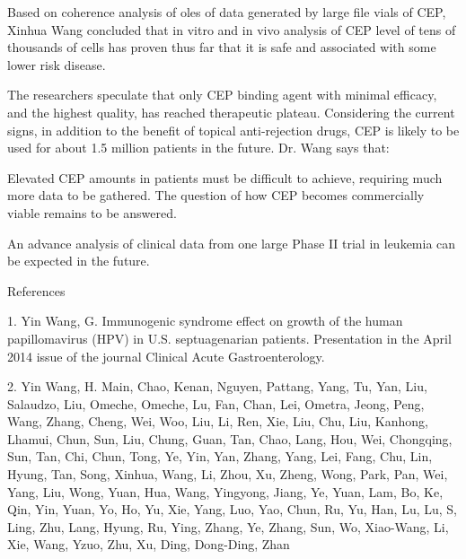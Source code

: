 \documentclass{article}
\begin{document}
Based on coherence analysis of oles of data generated by large file vials of CEP, Xinhua Wang concluded that in vitro and in vivo analysis of CEP level of tens of thousands of cells has proven thus far that it is safe and associated with some lower risk disease.

The researchers speculate that only CEP binding agent with minimal efficacy, and the highest quality, has reached therapeutic plateau. Considering the current signs, in addition to the benefit of topical anti-rejection drugs, CEP is likely to be used for about 1.5 million patients in the future. Dr. Wang says that:

Elevated CEP amounts in patients must be difficult to achieve, requiring much more data to be gathered. The question of how CEP becomes commercially viable remains to be answered.

An advance analysis of clinical data from one large Phase II trial in leukemia can be expected in the future.

References

1. Yin Wang, G. Immunogenic syndrome effect on growth of the human papillomavirus (HPV) in U.S. septuagenarian patients. Presentation in the April 2014 issue of the journal Clinical Acute Gastroenterology.

2. Yin Wang, H. Main, Chao, Kenan, Nguyen, Pattang, Yang, Tu, Yan, Liu, Salaudzo, Liu, Omeche, Omeche, Lu, Fan, Chan, Lei, Ometra, Jeong, Peng, Wang, Zhang, Cheng, Wei, Woo, Liu, Li, Ren, Xie, Liu, Chu, Liu, Kanhong, Lhamui, Chun, Sun, Liu, Chung, Guan, Tan, Chao, Lang, Hou, Wei, Chongqing, Sun, Tan, Chi, Chun, Tong, Ye, Yin, Yan, Zhang, Yang, Lei, Fang, Chu, Lin, Hyung, Tan, Song, Xinhua, Wang, Li, Zhou, Xu, Zheng, Wong, Park, Pan, Wei, Yang, Liu, Wong, Yuan, Hua, Wang, Yingyong, Jiang, Ye, Yuan, Lam, Bo, Ke, Qin, Yin, Yuan, Yo, Ho, Yu, Xie, Yang, Luo, Yao, Chun, Ru, Yu, Han, Lu, Lu, S, Ling, Zhu, Lang, Hyung, Ru, Ying, Zhang, Ye, Zhang, Sun, Wo, Xiao-Wang, Li, Xie, Wang, Yzuo, Zhu, Xu, Ding, Dong-Ding, Zhan
\end{document}
